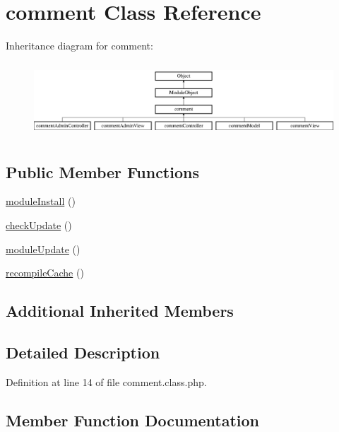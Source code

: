 \hypertarget{classcomment}{}\section{comment Class Reference}
\label{classcomment}
Inheritance diagram for comment\+:\begin{figure}[H]
\begin{center}
\leavevmode
\includegraphics[height=2.800000cm]{classcomment}
\end{center}
\end{figure}
\subsection*{Public Member Functions}
\begin{DoxyCompactItemize}
\item 
\hyperlink{classcomment_a635989397982dcf8a45c9a374bf11aec}{module\+Install} ()
\item 
\hyperlink{classcomment_a6ccae5215742b254afa1c06d1bc2d7d3}{check\+Update} ()
\item 
\hyperlink{classcomment_abcf41a36b46e090d498f35a0df92edc0}{module\+Update} ()
\item 
\hyperlink{classcomment_a904e04f286e217d550f26a38139107aa}{recompile\+Cache} ()
\end{DoxyCompactItemize}
\subsection*{Additional Inherited Members}


\subsection{Detailed Description}


Definition at line 14 of file comment.\+class.\+php.



\subsection{Member Function Documentation}
\hypertarget{classcomment_a6ccae5215742b254afa1c06d1bc2d7d3}{}\label{classcomment_a6ccae5215742b254afa1c06d1bc2d7d3} 
